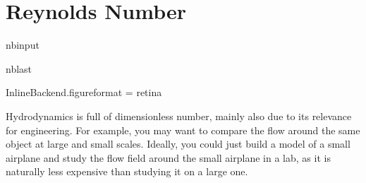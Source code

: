 \documentclass[letterpaper,10pt,english]{sphinxmanual}
\begin{document}
\chapter{Reynolds Number}
\label{\detokenize{notebooks/L18/1_Reynolds_Number:Reynolds-Number}}\label{\detokenize{notebooks/L18/1_Reynolds_Number::doc}}
\begin{sphinxuseclass}{nbinput}
\begin{sphinxuseclass}{nblast}
{
\begin{sphinxVerbatim}[commandchars=\\\{\}]
\llap{\color{nbsphinxin}[9]:\,\hspace{\fboxrule}\hspace{\fboxsep}}   
   
   
   
   
 

 InlineBackend.figure\PYGZus{}format = \PYGZsq{}retina\PYGZsq{}

    
      

\end{sphinxVerbatim}
}

\end{sphinxuseclass}
\end{sphinxuseclass}
\sphinxAtStartPar
Hydrodynamics is full of dimensionless number, mainly also due to its relevance for engineering. For example, you may want to compare the flow around the same object at large and small scales. Ideally, you could just build a model of a small airplane and study the flow field around the small airplane in a lab, as it is naturally less expensive than studying it on a large one.
\end{document}
